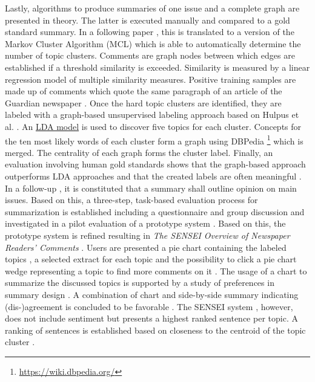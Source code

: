 Lastly, algorithms to produce summaries of one issue and a complete graph are presented in theory. The latter is executed manually and compared to a gold standard summary.
In a following paper \cite{DBLP:conf/ecir/AkerKBPBHG16}, this is translated to a version of the Markov Cluster Algorithm (MCL) \cite{vandongen00} which is able to automatically determine the number of topic clusters. Comments are graph nodes between which edges are established if a threshold similarity is exceeded. Similarity is measured by a linear regression model of multiple similarity measures. Positive training samples are made up of comments which quote the same paragraph of an article of the Guardian newspaper \cite{DBLP:conf/ecir/AkerKBPBHG16}. Once the hard topic clusters are identified, they are labeled with a graph-based unsupervised labeling approach based on Hulpus et al. \cite{DBLP:conf/wsdm/HulpusHKG13}. An \hyperref[LDA]{LDA model} is used to discover five topics for each cluster. Concepts for the ten most likely words of each cluster form a graph using DBPedia \footnote{\url{https://wiki.dbpedia.org/}} which is merged. The centrality of each graph forms the cluster label. Finally, an evaluation involving human gold standards shows that the graph-based approach outperforms LDA approaches and that the created labels are often meaningful \cite{DBLP:conf/ecir/AkerKBPBHG16}.
In a follow-up \cite{DBLP:conf/lrec/BarkerPFKAFHG16}, it is constituted that a summary shall outline opinion on main issues.
Based on this, a three-step, task-based evaluation process for summarization is established including a questionnaire and group discussion and investigated in a pilot evaluation of a prototype system \cite{DBLP:conf/lrec/BarkerPFKAFHG16}. Based on this, the prototype system is refined resulting in \textit{The SENSEI Overview of Newspaper Readers’ Comments} \cite{DBLP:conf/ecir/FunkABPHG17}. Users are presented a pie chart containing the labeled topics \cite{DBLP:conf/inlg/AkerPKFBHG16}, a selected extract for each topic and the possibility to click a pie chart wedge representing a topic to find more comments on it \cite{DBLP:conf/ecir/FunkABPHG17, DBLP:conf/inlg/AkerPKFBHG16}. The usage of a chart to summarize the discussed topics is supported by a study of preferences in summary design \cite{DBLP:journals/polibits/SanchanBA16}. A combination of chart and side-by-side summary indicating (dis-)agreement is concluded to be favorable \cite{DBLP:journals/polibits/SanchanBA16}. The SENSEI system \cite{DBLP:conf/ecir/FunkABPHG17}, however, does not include sentiment but presents a highest ranked sentence per topic. A ranking of sentences is established based on closeness to the centroid of the topic cluster \cite{DBLP:conf/inlg/AkerPKFBHG16}.
